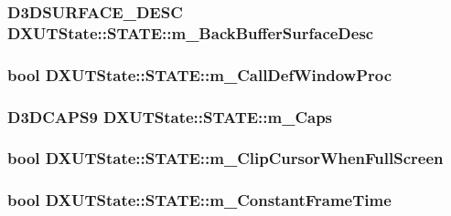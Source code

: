 \hypertarget{struct_d_x_u_t_state_1_1_s_t_a_t_e_aa932ec0f5b16e123a3a338e136b08026}{
\subsubsection[{m\_\-BackBufferSurfaceDesc}]{\setlength{\rightskip}{0pt plus 5cm}D3DSURFACE\_\-DESC {\bf DXUTState::STATE::m\_\-BackBufferSurfaceDesc}}}
\label{struct_d_x_u_t_state_1_1_s_t_a_t_e_aa932ec0f5b16e123a3a338e136b08026}
\hypertarget{struct_d_x_u_t_state_1_1_s_t_a_t_e_a1c6fea5f6353b2dfd213a97a42bca656}{
\subsubsection[{m\_\-CallDefWindowProc}]{\setlength{\rightskip}{0pt plus 5cm}bool {\bf DXUTState::STATE::m\_\-CallDefWindowProc}}}
\label{struct_d_x_u_t_state_1_1_s_t_a_t_e_a1c6fea5f6353b2dfd213a97a42bca656}
\hypertarget{struct_d_x_u_t_state_1_1_s_t_a_t_e_a0dfb26596a75b24576af5fcad2f6bfd4}{
\subsubsection[{m\_\-Caps}]{\setlength{\rightskip}{0pt plus 5cm}D3DCAPS9 {\bf DXUTState::STATE::m\_\-Caps}}}
\label{struct_d_x_u_t_state_1_1_s_t_a_t_e_a0dfb26596a75b24576af5fcad2f6bfd4}
\hypertarget{struct_d_x_u_t_state_1_1_s_t_a_t_e_a2e774e7182004e2dc8886b4eda221667}{
\subsubsection[{m\_\-ClipCursorWhenFullScreen}]{\setlength{\rightskip}{0pt plus 5cm}bool {\bf DXUTState::STATE::m\_\-ClipCursorWhenFullScreen}}}
\label{struct_d_x_u_t_state_1_1_s_t_a_t_e_a2e774e7182004e2dc8886b4eda221667}
\hypertarget{struct_d_x_u_t_state_1_1_s_t_a_t_e_a783529e74698e9a454c88bd5dc2a8b36}{
\subsubsection[{m\_\-ConstantFrameTime}]{\setlength{\rightskip}{0pt plus 5cm}bool {\bf DXUTState::STATE::m\_\-ConstantFrameTime}}}

